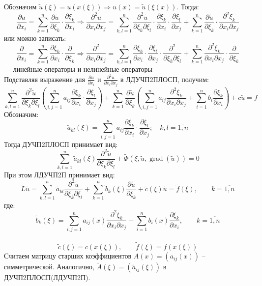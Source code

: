 Обозначим $\tilde u(\xi) = u(x(\xi)) \Longrightarrow u(x)=\tilde u(\xi(x))$. Тогда:
$$ 
  \frac{\partial u}{\partial x_i} = \sum^n_{k=1} \frac{\partial \tilde u}{\partial \xi_k}\cdot\frac{\partial \xi_k}{\partial x_i} 
  \Longrightarrow \frac{\partial^2 u}{\partial x_i \partial x_j}=
      \sum^n_{k, l=1} \frac{\partial^2 \tilde u}{\partial \xi_k\partial \xi_l}
      \cdot\frac{\partial \xi_k}{\partial x_i}\cdot\frac{\partial \xi_l}{\partial x_j}+
      \sum^n_{k=1} \frac{\partial \tilde u}{\partial \xi_k}\cdot\frac{\partial^2 \xi_k}{\partial x_i\partial x_j}
$$
или можно записать:
$$ 
  \frac{\partial}{\partial x_i} = \sum^n_{k=1} \frac{\partial \xi_k}{\partial x_i}\cdot\frac{\partial}{\partial \xi_k}
  \Longrightarrow \frac{\partial^2}{\partial x_i \partial x_j}=
      \sum^n_{k, l=1} \frac{\partial \xi_k}{\partial x_i}\cdot\frac{\partial \xi_l}{\partial x_j}
      \cdot\frac{\partial^2 }{\partial \xi_k\partial \xi_l}+
      \sum^n_{k=1} \frac{\partial^2 \xi_k}{\partial x_i\partial x_j}\cdot\frac{\partial}{\partial \xi_k}
$$
--- линейные операторы и нелинейные операторы \\ 
Подставляя выражение для $\frac{\partial u}{\partial x_i}$ и $\frac{\partial^2 u}{\partial x_i \partial x_j}$ в ЛДУЧП2ПЛОСП, получим:
$$ 
\sum_{k,l=1}^n \frac{\partial^2 \tilde u}{\partial \xi_k \partial \xi_l}( \sum_{i,j=1}^n a_{ij} \frac{\partial \xi_k}{\partial x_i}\cdot \frac{\partial \xi_l}{\partial x_j} )
+ \sum_{k=1}^n \frac{\partial \tilde u}{\partial\xi_k}(\sum_{i,j=1}^n a_{ij}\frac{\partial^2 \xi_k}{\partial x_i \partial x_j} + \sum^n_{i=1}b_i \frac{\partial \xi_k}{\partial x_i}) + c\tilde u = f
$$%
Обозначим:
$$ \tilde a_{kl}(\xi) = \sum^n_{i,j = 1}a_{ij}\frac{\partial \xi_k }{\partial x_i}\cdot\frac{\partial \xi_l}{\partial x_j}; \quad k,l = \overline{1,n} $$
Тогда ДУЧП2ПЛОСП принимает вид:
$$ \sum^n_{k,l=1}\tilde a_{kl}(\xi) \frac{\partial^2 \tilde u}{\partial \xi_k \partial \xi_l} + \tilde \Phi(\xi, \tilde u, \operatorname{grad}(\tilde u)) = 0 $$
При этом ЛДУЧП2П принимает вид: 
$$ \tilde L \tilde u = \sum^n_{k,l=1}\tilde a_{kl} \frac{\partial^2\tilde u}{\partial \xi_k \partial \xi_l} +
\sum^n_{k=1} \tilde b_k (\xi) \frac{\partial \tilde{u}}{\partial \xi_k} + \tilde{c}(\xi)\tilde{u} = \tilde{f}(\xi), \qquad k=\overline{1,n}
$$
где: $$\displaystyle \tilde b_k(\xi) = \sum^n_{i,j=1}a_{ij}(x)\frac{\partial^2 \xi_k}{\partial x_i\partial x_j}+\sum^n_{i=1}b_i(x)\frac{\partial\xi_k}{\partial x_i},\qquad k=\overline{1,n}$$\\
$$\tilde c(\xi)=c(x(\xi)),\qquad\tilde f(\xi) = f(x(\xi))$$
Считаем матрицу старших коэффициентов $A(x)=(a_{ij}(x))$ -- симметрической. Аналогично, $ \tilde A(\xi)=(\tilde a_{ij}(\xi)) $ в ДУЧП2ПЛОСП(ЛДУЧП2П).\\
